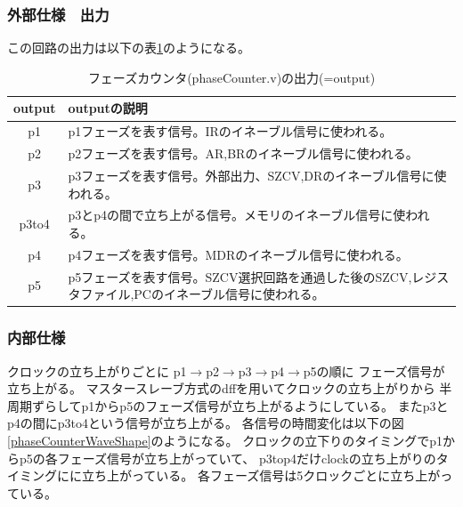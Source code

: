 \documentclass[a4j,titlepage]{jarticle}
\begin{document}
\subsubsection{外部仕様　出力}
この回路の出力は以下の表\ref{phaseCounterO}のようになる。
\begin{table}[H]
    \caption{フェーズカウンタ(phaseCounter.v)の出力(=output)}
    \label{phaseCounterO}
    \begin{center}
    \begin {tabularx}{150mm}{|c|X|} \hline
         output & outputの説明 \\ \hline \hline
         p1 & p1フェーズを表す信号。IRのイネーブル信号に使われる。\\ \hline
         p2 & p2フェーズを表す信号。AR,BRのイネーブル信号に使われる。\\ \hline %
         p3 & p3フェーズを表す信号。外部出力、SZCV,DRのイネーブル信号に使われる。\\ \hline
         p3to4 & p3とp4の間で立ち上がる信号。メモリのイネーブル信号に使われる。\\ \hline
         p4 & p4フェーズを表す信号。MDRのイネーブル信号に使われる。\\ \hline
         p5 & p5フェーズを表す信号。SZCV選択回路を通過した後のSZCV,レジスタファイル,PCのイネーブル信号に使われる。\\ \hline
    \end {tabularx}
    \end{center}
\end{table}

\subsubsection{内部仕様}
クロックの立ち上がりごとに
p1$\rightarrow$p2$\rightarrow$p3$\rightarrow$p4$\rightarrow$p5の順に
フェーズ信号が立ち上がる。
マスタースレーブ方式のdffを用いてクロックの立ち上がりから
半周期ずらしてp1からp5のフェーズ信号が立ち上がるようにしている。
またp3とp4の間にp3to4という信号が立ち上がる。
各信号の時間変化は以下の図\ref{phaseCounterWaveShape}のようになる。
クロックの立下りのタイミングでp1からp5の各フェーズ信号が立ち上がっていて、
p3top4だけclockの立ち上がりのタイミングにに立ち上がっている。
各フェーズ信号は5クロックごとに立ち上がっている。
\end{document}
